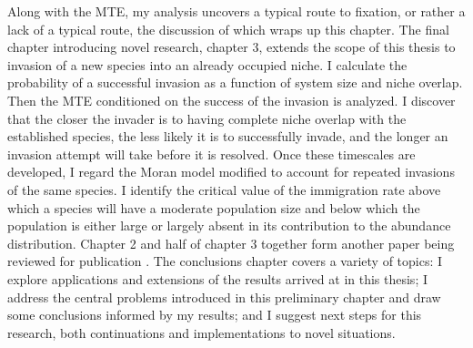 Along with the MTE, my analysis uncovers a typical route to fixation, or rather a lack of a typical route, the discussion of which wraps up this chapter. %
The final chapter introducing novel research, chapter 3, extends the scope of this thesis to invasion of a new species into an already occupied niche. %
I calculate the probability of a successful invasion as a function of system size and niche overlap. 
Then the MTE conditioned on the success of the invasion is analyzed. 
I discover that the closer the invader is to having complete niche overlap with the established species, the less likely it is to successfully invade, and the longer an invasion attempt will take before it is resolved. %
Once these timescales are developed, I regard the Moran model modified to account for repeated invasions of the same species. 
I identify the critical value of the immigration rate above which a species will have a moderate population size and below which the population is either large or largely absent in its contribution to the abundance distribution. %
Chapter 2 and half of chapter 3 together form another paper being reviewed for publication \cite{Badali2018}. %
The conclusions chapter covers a variety of topics: I explore applications and extensions of the results arrived at in this thesis; I address the central problems introduced in this preliminary chapter and draw some conclusions informed by my results; and I suggest next steps for this research, both continuations and implementations to novel situations. 
\fi
\iffalse
Big Questions:
How long will a single species exist with only intraspecies interactions?
What mathematical techniques are effective to model such an extinction? 
How long will a species exist with intra and interspecies interactions? That is, how long will two species coexist given some niche overlap? In particular, how does it transition from the effective coexistence of exponential scaling of MTE with carrying capacity to the relatively fast extinction of algebraic scaling as found in the Moran model/limit? 
For an ecosystem with an already established species, what is the probability of success and the timescale of an invasion attempt? How do these probabilities and times depend on niche overlap? 
With repeated immigration of a species, how will that species be distributed in a [neutral] system? In particular, how does the distribution depend on the immigration rate? 
What is the timescale of species transient existence in a neutral model with repeated immigrants? 
Is v=1/gN or gv=1/N the same as a model with v’=gv and g=1? - looks like it should be
\fi



